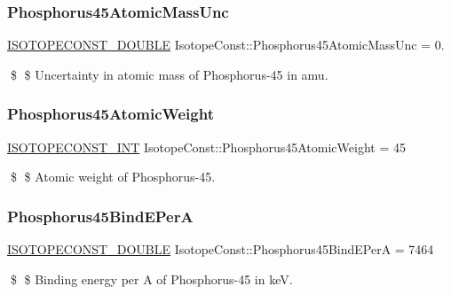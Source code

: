 \subsubsection{\texorpdfstring{Phosphorus45\+Atomic\+Mass\+Unc}{Phosphorus45AtomicMassUnc}}
{\footnotesize\ttfamily \mbox{\hyperlink{group___isotope_const-_macros_ga8f45a7272ce02c0b4c65c44636ed719a}{I\+S\+O\+T\+O\+P\+E\+C\+O\+N\+S\+T\+\_\+\+D\+O\+U\+B\+LE}} Isotope\+Const\+::\+Phosphorus45\+Atomic\+Mass\+Unc = 0.}

\$ \$ Uncertainty in atomic mass of Phosphorus-\/45 in amu. \mbox{\label{group___isotope_const-_phosphorus-_p45_gae8668e749b5d4a6b706bc60ebf3082e4}} 
\subsubsection{\texorpdfstring{Phosphorus45\+Atomic\+Weight}{Phosphorus45AtomicWeight}}
{\footnotesize\ttfamily \mbox{\hyperlink{group___isotope_const-_macros_ga5f18360b3e99483a35c32d789e62621c}{I\+S\+O\+T\+O\+P\+E\+C\+O\+N\+S\+T\+\_\+\+I\+NT}} Isotope\+Const\+::\+Phosphorus45\+Atomic\+Weight = 45}

\$ \$ Atomic weight of Phosphorus-\/45. \mbox{\label{group___isotope_const-_phosphorus-_p45_ga04de42e2535d2f4c3662c6af890fac27}} 
\subsubsection{\texorpdfstring{Phosphorus45\+Bind\+E\+PerA}{Phosphorus45BindEPerA}}
{\footnotesize\ttfamily \mbox{\hyperlink{group___isotope_const-_macros_ga8f45a7272ce02c0b4c65c44636ed719a}{I\+S\+O\+T\+O\+P\+E\+C\+O\+N\+S\+T\+\_\+\+D\+O\+U\+B\+LE}} Isotope\+Const\+::\+Phosphorus45\+Bind\+E\+PerA = 7464}

\$ \$ Binding energy per A of Phosphorus-\/45 in keV. \mbox{\label{group___isotope_const-_phosphorus-_p45_gaabaaa266d3c7e95448394bdcbc1f1583}} 
